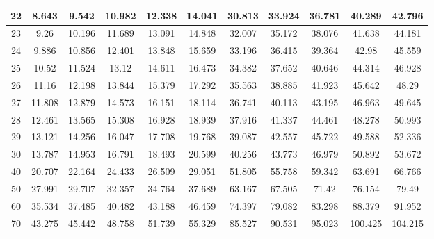 \begin{table}[htb]
{\begin{tabular}{|c|c|c|c|c|c|c|c|c|c|c|}
22 & 8.643          & 9.542         & 10.982         & 12.338        & 14.041       & 30.813       & 33.924        & 36.781         & 40.289        & 42.796         \\ \hline
23 & 9.26           & 10.196        & 11.689         & 13.091        & 14.848       & 32.007       & 35.172        & 38.076         & 41.638        & 44.181         \\ \hline
24 & 9.886          & 10.856        & 12.401         & 13.848        & 15.659       & 33.196       & 36.415        & 39.364         & 42.98         & 45.559         \\ \hline
25 & 10.52          & 11.524        & 13.12          & 14.611        & 16.473       & 34.382       & 37.652        & 40.646         & 44.314        & 46.928         \\ \hline
26 & 11.16          & 12.198        & 13.844         & 15.379        & 17.292       & 35.563       & 38.885        & 41.923         & 45.642        & 48.29          \\ \hline
27 & 11.808         & 12.879        & 14.573         & 16.151        & 18.114       & 36.741       & 40.113        & 43.195         & 46.963        & 49.645         \\ \hline
28 & 12.461         & 13.565        & 15.308         & 16.928        & 18.939       & 37.916       & 41.337        & 44.461         & 48.278        & 50.993         \\ \hline
29 & 13.121         & 14.256        & 16.047         & 17.708        & 19.768       & 39.087       & 42.557        & 45.722         & 49.588        & 52.336         \\ \hline
30 & 13.787         & 14.953        & 16.791         & 18.493        & 20.599       & 40.256       & 43.773        & 46.979         & 50.892        & 53.672         \\ \hline
40 & 20.707         & 22.164        & 24.433         & 26.509        & 29.051       & 51.805       & 55.758        & 59.342         & 63.691        & 66.766         \\ \hline
50 & 27.991         & 29.707        & 32.357         & 34.764        & 37.689       & 63.167       & 67.505        & 71.42          & 76.154        & 79.49          \\ \hline
60 & 35.534         & 37.485        & 40.482         & 43.188        & 46.459       & 74.397       & 79.082        & 83.298         & 88.379        & 91.952         \\ \hline
70 & 43.275         & 45.442        & 48.758         & 51.739        & 55.329       & 85.527       & 90.531        & 95.023         & 100.425       & 104.215        \\ \hline

\end{tabular}}
\end{table}
